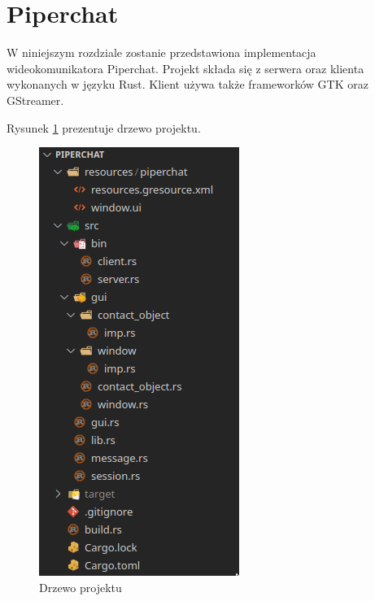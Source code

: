 \section{Piperchat}

W niniejszym rozdziale zostanie przedstawiona implementacja wideokomunikatora Piperchat. Projekt
składa się z serwera oraz klienta wykonanych w języku Rust. Klient używa także frameworków GTK oraz
GStreamer.

Rysunek \ref{fig:project_tree} prezentuje drzewo projektu.


\begin{figure}[H]
    \centering
    \includegraphics[height=.4\textheight]{img/implementacja/project_tree}
    \caption{Drzewo projektu}
    \label{fig:project_tree}
\end{figure}

